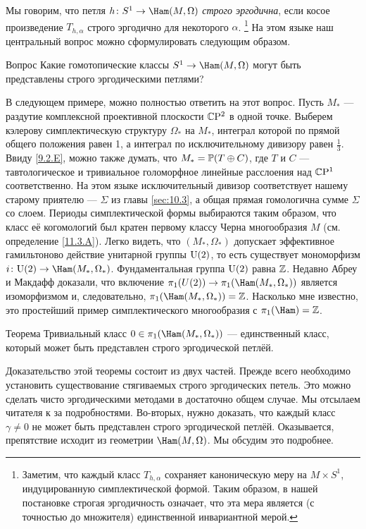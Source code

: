 Мы говорим, что петля $h\:S^1\to\Ham(M,\Omega)$ \emph{строго эргодична}, если косое произведение $T_{h,\alpha}$ строго эргодично
для некоторого $\alpha$.%
\footnote{Заметим, что каждый класс $T_{h,\alpha}$ сохраняет
  каноническую меру на $M \times S^1$, индуцированную симплектической
  формой.
Таким образом, в нашей постановке строгая эргодичность означает, что
эта мера является (с точностью до множителя) единственной инвариантной
мерой.} 
На этом языке наш центральный вопрос можно сформулировать следующим образом.

\begin{ex*}{Вопрос}
Какие гомотопические классы $S^1 \to \Ham(M, \Omega)$ могут быть
представлены строго эргодическими петлями? 
\end{ex*}

В следующем примере, можно полностью ответить на этот вопрос.
Пусть $M_\ast$ — раздутие комплексной проективной плоскости $\mathbb{C}\mathrm{P}^2$
в одной точке. 
Выберем кэлерову симплектическую структуру $\Omega_\ast$ на $M_\ast$,
интеграл которой по прямой общего положения равен 1, а интеграл по
исключительному дивизору равен $\tfrac13$. 
Ввиду \ref{9.2.E}, можно также думать, что $M_\ast = \mathbb{P}(T \oplus
C)$, где $T$ и $C$ — тавтологическое и тривиальное голоморфное
линейные расслоения над $\mathbb{C}\mathrm{P}^1$ соответственно. 
На этом языке исключительный дивизор соответствует нашему старому
приятелю — $\Sigma$ из главы \ref{sec:10.3}, а общая прямая гомологична
сумме $\Sigma$ со слоем. 
Периоды симплектической формы выбираются таким образом, что класс её
когомологий был кратен первому классу Черна многообразия $M$
(см. определение \ref{11.3.A}). 
Легко видеть, что $(M_\ast, \Omega_\ast)$ допускает эффективное
гамильтоново действие унитарной группы $\mathrm{U}(2)$, то есть существует
мономорфизм $i\: \U(2) \to \Ham(M_\ast, \Omega_\ast)$. 
Фундаментальная группа $\mathrm{U}(2)$ равна $\mathbb{Z}$.
Недавно Абреу и Макдафф \cite{AM} доказали, что включение $\pi_1(U(2))
\to \pi_1 (\Ham(M_\ast, \Omega_\ast))$ является изоморфизмом и,
следовательно, $\pi_1(\Ham(M_\ast, \Omega_\ast)) = \ZZ$. 
Насколько мне известно, это простейший пример симплектического
многообразия с $\pi_1 (\Ham) = \ZZ$. 

\begin{thm}{Теорема}\label{11.1.A}
Тривиальный класс $0\in\pi_1(\Ham(M_\ast, \Omega_\ast))$ —
единственный класс, который может быть представлен строго эргодической
петлёй. 
\end{thm}

Доказательство этой теоремы состоит из двух частей.
Прежде всего необходимо установить существование стягиваемых строго
эргодических петель. 
Это можно сделать чисто эргодическими методами в достаточно общем случае.
Мы отсылаем читателя к \cite{P9} за подробностями.
Во-вторых, нужно доказать, что каждый класс $\gamma \ne 0$ не может
быть представлен строго эргодической петлёй. 
Оказывается, препятствие исходит из геометрии $\Ham(M, \Omega)$.
Мы обсудим это подробнее.

